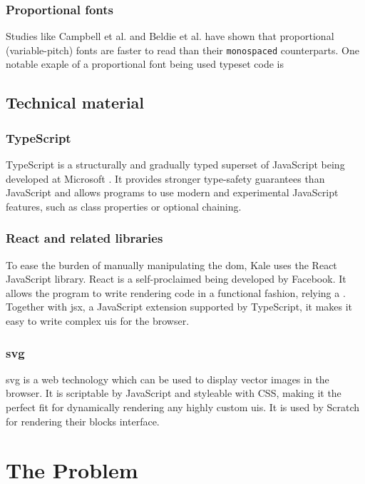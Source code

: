 \documentclass[11pt]{report}
\begin{document}
\subsection{Proportional fonts}
Studies like Campbell et al. \cite{Campbell1981} and Beldie et al.
\cite{Beldie1983} have shown that proportional (variable-pitch) fonts are
faster to read than their \texttt{monospaced} counterparts. One notable exaple
of a proportional font being used typeset code is 

\section{Technical material}

\subsection{TypeScript}
TypeScript is a structurally and gradually typed superset of JavaScript being
developed at Microsoft \cite{Typescript}. It provides stronger type-safety
guarantees than JavaScript and allows programs to use modern and experimental
JavaScript features, such as class properties or optional chaining. 


\subsection{React and related libraries}
To ease the burden of manually manipulating the \ac{dom}, Kale uses the React
\cite{React} JavaScript library. React is a self-proclaimed  being developed by Facebook. It
allows the program to write rendering
code in a functional fashion, relying a . Together with \ac{jsx}, a JavaScript extension supported by
TypeScript, it makes it easy to write complex \acp{ui} for the browser.

\subsection{\acf{svg}}
\ac{svg} is a web technology which can be used to display vector images in the
browser. It is scriptable by JavaScript and styleable with CSS, making it the
perfect fit for dynamically rendering any highly custom \acp{ui}. It is used by
Scratch for rendering their blocks interface.

\chapter{The Problem}
\end{document}
